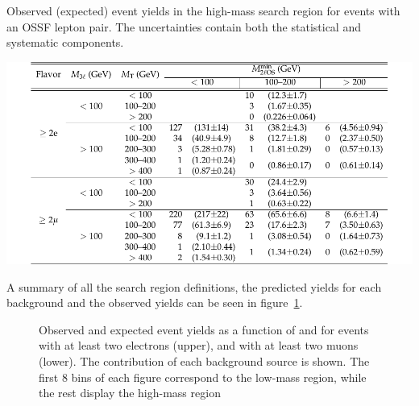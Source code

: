 \begin{table}[tbh]
\centering
\caption{Observed (expected) event yields in the high-mass search region for events with an
OSSF lepton pair. The uncertainties contain both the statistical and systematic components.}
\label{tab:YieldshighmassnoOSSF}
\includegraphics[width=0.7\linewidth]{Figures/c5/tables/CMS-EXO-17-012_Table_0A3.pdf}
\end{table}

A summary of all the search region definitions, the predicted yields for each background and the observed yields can be seen in figure~\ref{fig:allSRplotMuon}.
\begin{figure}[th]
\noindent
{}
\caption{Observed and expected event yields as a function of \mmin and
  \mtmin for events with
at least two electrons (upper), and with at least two muons (lower). The contribution of each
background source is shown. The first 8 bins of each figure correspond to the low-mass region,
while the rest display the high-mass region}
\label{fig:allSRplotMuon}
\end{figure}

